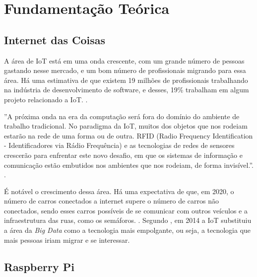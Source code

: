 \documentclass[
	12pt,				%
	openright,			%
	oneside,			%
	a4paper,			%
	chapter=TITLE,		%
	english,			%
	brazil				%
	]{abntex2}
\begin{document}
{%


\chapter{Fundamentação Teórica}\label{cap:fundamentacao-teorica}

\section{Internet das Coisas}

A área de IoT está em uma onda crescente, com um grande número de pessoas gastando nesse mercado, e um bom número de profissionais migrando para essa área. Há uma estimativa de que existem 19 milhões de profissionais trabalhando na indústria de desenvolvimento de software, e desses, 19\% trabalham em algum projeto relacionado a IoT. \cite{cw-iot}.

\begin{citacao}
''A próxima onda na era da computação será fora do domínio do ambiente de trabalho tradicional. No paradigma da IoT, muitos dos objetos que nos rodeiam estarão na rede de uma forma ou de outra. RFID (Radio Frequency Identification - Identificadores via Rádio Frequência) e as tecnologias de redes de sensores crescerão para enfrentar este novo desafio, em que os sistemas de informação e comunicação estão embutidos nos ambientes que nos rodeiam, de forma invisível.''. \cite{iot-article}. 
\end{citacao}

É notável o crescimento dessa área. Há uma expectativa de que, em 2020, o número de carros conectados a internet supere o número de carros não conectados, sendo esses carros possíveis de se comunicar com outros veículos e a infraestrutura das ruas, como os semáforos. \cite{goldmansachs-iot}. Segundo , em 2014 a IoT substituiu a área da \textit{Big Data} como a tecnologia mais empolgante, ou seja, a tecnologia que mais pessoas iriam migrar e se interessar. 


\section{Raspberry Pi}

}
\end{document}
